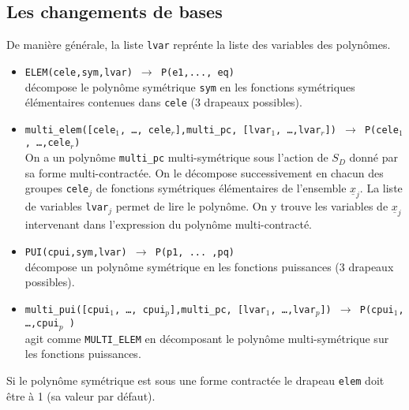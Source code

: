 \subsection{Les changements de bases}
De mani\`ere g\'en\'erale, la liste {\tt lvar} repr\'ente la liste des
variables des polyn\^omes.
\begin{itemize}
\item {\tt ELEM(cele,sym,lvar) 
  $\longrightarrow$  P(e1,..., eq)}\\
 d\'{e}compose le polyn\^{o}me sym\'{e}trique {\tt sym} 
en les fonctions  sym\'{e}triques \'{e}l\'{e}mentaires
contenues dans {\tt cele} (3 drapeaux possibles).
\item {\tt multi\_elem([cele$_{1}$, \ldots, cele$_{r}$],multi\_pc,
[lvar$_{1}$, \ldots,lvar$_{r}$])  
$\longrightarrow$ 
 P(cele$_{1}$, \ldots ,cele$_{r}$)}\\
On a un polyn\^{o}me {\tt multi\_pc} multi-sym\'{e}trique sous l'action
de $S_D$ donn\'e par sa
forme multi-contract\'ee.
On le d\'ecompose
successivement en chacun des groupes {\tt cele$_{j}$} de
fonctions  sym\'{e}triques \'{e}l\'{e}mentaires de l'ensemble 
${\underline x}_j$. La liste
de variables {\tt lvar}$_j$ permet de lire le polyn\^ome. 
On y trouve les variables de ${\underline x}_j$ intervenant dans l'expression 
du polyn\^ome multi-contract\'e.

\item {\tt PUI(cpui,sym,lvar) 
$\longrightarrow$ P(p1, ... ,pq)}\\
 d\'{e}compose un polyn\^{o}me sym\'{e}trique en les 
fonctions
puissances (3 drapeaux possibles).
\item {\tt multi\_pui([cpui$_{1}$, \ldots, cpui$_{p}$],multi\_pc,
[lvar$_{1}$, \ldots,lvar$_{p}$]) 
 $\longrightarrow$ 
 P(cpui$_{1}$, \ldots ,cpui$_{p}$ )}\\
agit comme {\tt MULTI\_ELEM} en d\'ecomposant le polyn\^ome multi-sym\'etrique
sur les fonctions puissances.
\end{itemize}

Si le polyn\^{o}me sym\'{e}trique est sous une forme contract\'{e}e
le drapeau {\tt elem} doit \^{e}tre \`{a} 1 (sa valeur par d\'{e}faut).

